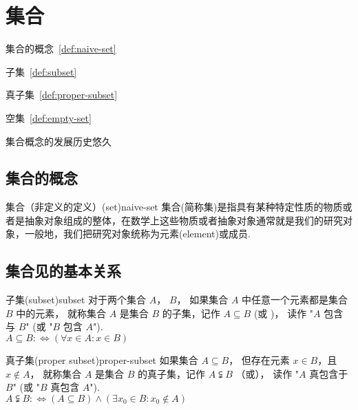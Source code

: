 \documentclass[../main.tex]{subfiles}
\begin{document}
\section{集合}
\begin{introduction}
    \item 集合的概念~\ref{def:naive-set}
    \item 子集~\ref{def:subset}
    \item 真子集~\ref{def:proper-subset}
    \item 空集~\ref{def:empty-set}
\end{introduction}

集合概念的发展历史悠久

\subsection{集合的概念}

\begin{definition}{集合（非定义的定义）(set)}{naive-set}
    \textcolor{main}{集合}(简称集)是指具有某种特定性质的物质或者是抽象对象组成的整体，在数学上这些物质或者抽象对象通常就是我们的研究对象，一般地，我们把研究对象统称为\textcolor{main}{元素}(element)或成员.
\end{definition}

\subsection{集合见的基本关系}
\begin{definition}{子集(subset)}{subset}
   对于两个集合 $A$， $B$， 如果集合 $A$ 中任意一个元素都是集合 $B$ 中的元素， 就称集合 $A$ 是集合 $B$ 的\textcolor{main}{子集}，记作 $A \subseteq B$ (或 )， 读作 "$A$ 包含与 $B$" (或 "$B$ 包含 $A$"). \\
   $A \subseteq B :\Leftrightarrow (\forall x \in A: x \in B)$
\end{definition}

\begin{definition}{真子集(proper subset)}{proper-subset}
   如果集合 $A \subseteq B$， 但存在元素 $x \in B$，且 $x \notin A$， 就称集合 $A$ 是集合 $B$ 的\textcolor{main}{真子集}，记作 $A \subsetneqq B$ （或）， 读作 "$A$ 真包含于 $B$" (或 "$B$ 真包含 $A$").\\
   $A \subsetneqq B :\Leftrightarrow (A \subseteq B) \land (\exists x_0 \in B: x_0 \notin A)$
\end{definition}
\end{document}
